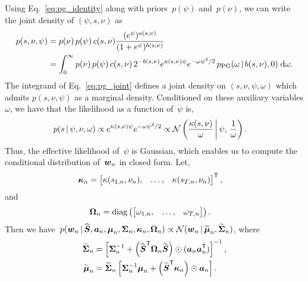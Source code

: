 Using Eq.~\ref{eq:pg_identity} along with priors~$p(\psi)$ and~$p(\nu)$, we can write the joint density of $(\psi, s, \nu)$ as
\begin{align}
  \label{eq:pg_joint}
  p(s, \nu, \psi)
  &= p(\nu) \, p(\psi) \, c(s, \nu) \frac{(e^\psi)^{a(s, \nu)}}{(1+e^\psi)^{b(s, \nu)}} \\
  &= \int_0^\infty
  p(\nu) \, p(\psi) \, c(s, \nu) \, 2^{-b(s, \nu)} e^{\kappa(s, \nu) \psi} e^{-\omega \psi^2/2} \, p_{\mathrm{PG}}(\omega \,|\, b(s, \nu), 0) \; \mathrm{d}\omega.
\end{align}
The integrand of Eq.~\ref{eq:pg_joint} defines a joint density on $(s, \nu, \psi, \omega)$ which admits $p(s, \nu, \psi)$ as a marginal density.
Conditioned on these auxiliary variables $\omega$, we have that the likelihood as a function of~$\psi$ is,
\begin{align}
  p(s \,|\, \psi, \nu, \omega)
  &\propto e^{\kappa(s, \nu) \psi} e^{- \omega \psi^2/2} 
\propto \mathcal{N} \left(\frac{\kappa(s, \nu)}{\omega} \, \bigg| \, \psi, \, \frac{1}{\omega} \right).
\end{align}
Thus, the effective likelihood of~$\psi$ is Gaussian, which enables
us to compute the conditional distribution of~$\boldsymbol{w}_n$ in closed form.
Let,
\begin{align}
  \boldsymbol{\kappa}_n
  &= \begin{bmatrix} \kappa(s_{1,n}, \nu_n), &\ldots, &\kappa(s_{T,n}, \nu_n)
  \end{bmatrix}^{\mathsf{T}},
\end{align}
and
\begin{align}
  \boldsymbol{\Omega}_n &= \mathrm{diag} \left(
  \begin{bmatrix}
    \omega_{1,n}, & \ldots, & \omega_{T,n}
  \end{bmatrix}
  \right).
\end{align}
Then we have~$
  p(\boldsymbol{w}_n \,|\, \widehat{\boldsymbol{S}}, \boldsymbol{a}_n, \boldsymbol{\mu}_n, \boldsymbol{\Sigma}_n, \boldsymbol{\kappa}_n, \boldsymbol{\Omega}_n)
  \propto \mathcal{N}(\boldsymbol{w}_n \,|\, \widetilde{\boldsymbol{\mu}}_n, \widetilde{\boldsymbol{\Sigma}}_n)$,
where
\begin{align}
  \widetilde{\boldsymbol{\Sigma}}_n &= \left[ \boldsymbol{\Sigma}_n^{-1} +
  \left(\widehat{\boldsymbol{S}}^{\mathsf{T}} \boldsymbol{\Omega}_n \widehat{\boldsymbol{S}} \right) \odot (\boldsymbol{a}_n \boldsymbol{a}_n^{\mathsf{T}}) \right]^{-1}, \\
  \widetilde{\boldsymbol{\mu}}_n &= \widetilde{\boldsymbol{\Sigma}}_n \left[ \boldsymbol{\Sigma}_n^{-1} \boldsymbol{\mu}_n +
  \left(\widehat{\boldsymbol{S}}^{\mathsf{T}} \boldsymbol{\kappa}_n \right) \odot \boldsymbol{a}_n \right].
\end{align}

